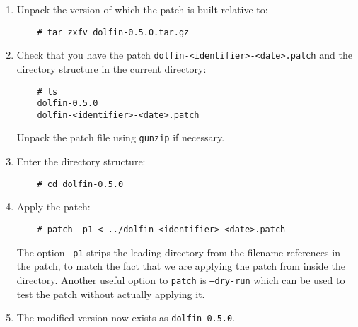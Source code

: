 \begin{enumerate}
\item
  Unpack the version of \dolfin{} which the patch is built relative to:
  \begin{verbatim}
    # tar zxfv dolfin-0.5.0.tar.gz
  \end{verbatim}
\item
  Check that you have the patch \texttt{dolfin-<identifier>-<date>.patch} and the \dolfin{}
  directory structure in the current directory:
  \begin{verbatim}
    # ls
    dolfin-0.5.0
    dolfin-<identifier>-<date>.patch
  \end{verbatim}
  Unpack the patch file using \texttt{gunzip} if necessary.
\item
  Enter the \dolfin{} directory structure:
  \begin{verbatim}
    # cd dolfin-0.5.0
  \end{verbatim}
\item
  Apply the patch:
  \begin{verbatim}
    # patch -p1 < ../dolfin-<identifier>-<date>.patch
  \end{verbatim}
  The option \texttt{-p1} strips the leading directory from the filename
  references in the patch, to match the fact that we are applying the
  patch from inside the directory. Another useful option to
  \texttt{patch} is \texttt{--dry-run} which can be used to test the
  patch without actually applying it.
\item
  The modified version now exists as \texttt{dolfin-0.5.0}.
\end{enumerate}
